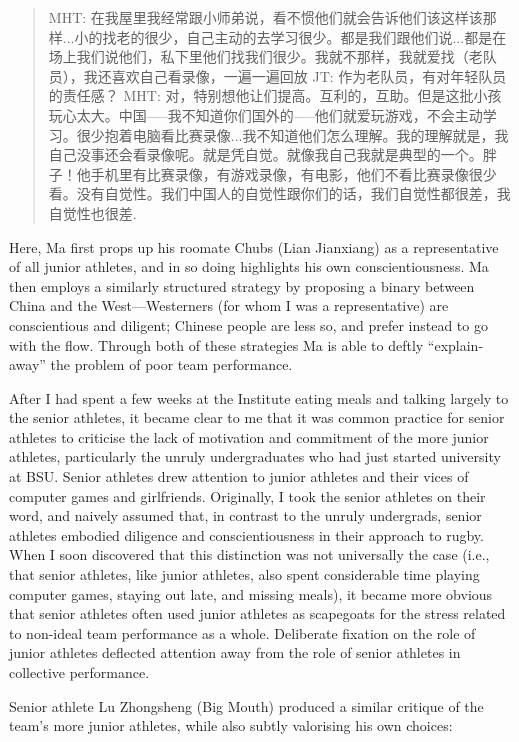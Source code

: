 \begin{CJK}{UTF8}{gbsn}
  \begin{quote}
    MHT: 在我屋里我经常跟小师弟说，看不惯他们就会告诉他们该这样该那样...小的找老的很少，自己主动的去学习很少。都是我们跟他们说...都是在场上我们说他们，私下里他们找我们很少。我就不那样，我就爱找（老队员），我还喜欢自己看录像，一遍一遍回放
    JT: 作为老队员，有对年轻队员的责任感？
    MHT: 对，特别想他让们提高。互利的，互助。但是这批小孩玩心太大。中国—--我不知道你们国外的—--他们就爱玩游戏，不会主动学习。很少抱着电脑看比赛录像...我不知道他们怎么理解。我的理解就是，我自己没事还会看录像呢。就是凭自觉。就像我自己我就是典型的一个。胖子！他手机里有比赛录像，有游戏录像，有电影，他们不看比赛录像很少看。没有自觉性。我们中国人的自觉性跟你们的话，我们自觉性都很差，我自觉性也很差.
  \end{quote}

Here, Ma first props up his roomate Chubs (Lian Jianxiang) as a representative of all junior athletes, and in so doing highlights his own conscientiousness.  Ma then employs a similarly structured strategy by proposing a binary between China and the West---Westerners (for whom I was a representative) are conscientious and diligent; Chinese people are less so, and prefer instead to go with the flow.  Through both of these strategies Ma is able to deftly ``explain-away'' the problem of poor team performance.

After I had spent a few weeks at the Institute eating meals and talking largely to the senior athletes, it became clear to me that it was common practice for senior athletes to criticise the lack of motivation and commitment of the more junior athletes, particularly the unruly undergraduates who had just started university at BSU.  Senior athletes drew attention to junior athletes and their vices of computer games and girlfriends.  Originally, I took the senior athletes on their word, and naively assumed that, in contrast to the unruly undergrads, senior athletes embodied diligence and conscientiousness in their approach to rugby.  When I soon discovered that this distinction was not universally the case (i.e., that senior athletes, like junior athletes, also spent considerable time playing computer games, staying out late, and missing meals), it became more obvious that senior athletes often used junior athletes as scapegoats for the stress related to non-ideal team performance as a whole.
Deliberate fixation on the role of junior athletes deflected attention away from the role of senior athletes in collective performance.

Senior athlete Lu Zhongsheng (Big Mouth) produced a similar critique of the team's more junior athletes, while also subtly valorising his own choices:


\end{CJK}

